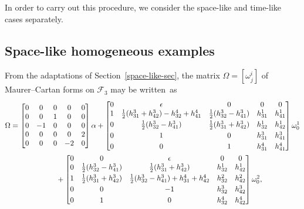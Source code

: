 \documentclass[pdftex]{sigma}
\numberwithin{equation}{section}
\theoremstyle{definition}
\begin{document}
In order to carry out this procedure, we consider the space-like and time-like cases separately.

\subsection{Space-like homogeneous examples}

From the adaptations of Section~\ref{space-like-sec}, the matrix $\Omega = [\omega^i_j]$ of Maurer--Cartan forms on
$\mathcal{F}_3$ may be written~as
\begin{gather}
\Omega =
\begin{bmatrix}
0 & 0 & 0 & 0 & 0
\\
0 & 0 & 1 & 0 & 0
\\
0 & -1 & 0 & 0 & 0
\\
0 & 0 & 0 & 0 & 2
\\
0 & 0 & 0 & -2 & 0
\end{bmatrix}
\alpha
+
\begin{bmatrix}
0 & \epsilon & 0 & 0 & 0
\\
1 & \tfrac{1}{2}(h^3_{31} + h^3_{42}) - h^4_{32} + h^4_{41} & \tfrac{1}{2}(h^3_{32} - h^3_{41}) & h^1_{31} &
h^1_{41}
\vspace{1mm}\\
0 & \tfrac{1}{2}(h^3_{32} - h^3_{41}) & \tfrac{1}{2}(h^3_{31} + h^3_{42}) & h^1_{32} & h^1_{42}
\vspace{1mm}\\
0 & 1 & 0 & h^3_{31} & h^3_{41}
\vspace{1mm}\\
0 & 0 & 1 & h^4_{31} & h^4_{41}
\end{bmatrix}
\omega^1_0
\nonumber
\\
\phantom{\Omega =}{}
+
\begin{bmatrix}
0 & 0 & \epsilon & 0 & 0
\\
0 & \tfrac{1}{2}(h^3_{32} - h^3_{41}) & \tfrac{1}{2}(h^3_{31} + h^3_{42}) & h^1_{32} & h^1_{42}
\vspace{1mm}\\
1 & \tfrac{1}{2}(h^3_{31} + h^3_{42}) & \tfrac{1}{2}(h^3_{32} - h^3_{41}) + h^4_{31} + h^4_{42} & h^2_{32} &
h^2_{42}
\vspace{1mm}\\
0 & 0 & -1 & h^3_{32} & h^3_{42}
\vspace{1mm}\\
0 & 1 & 0 & h^4_{32} & h^4_{42}
\end{bmatrix}
\omega^2_0,
\label{space-like-reduced-MC-form}
\end{gather}
\end{document}
